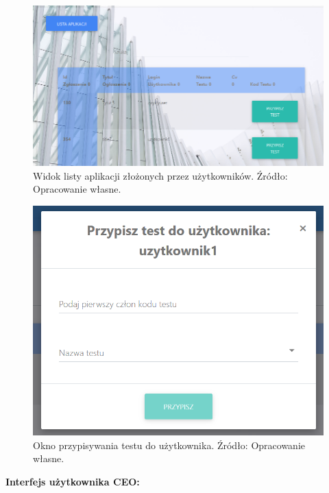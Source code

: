 \documentclass[twoside]{projektInzynierskiMS}
\numberwithin{figure}{section}
\begin{document}
\begin{figure}[h!]
    \centering
    \includegraphics[scale=0.6]{images/listaAplikacjiHr.png}
    \caption{Widok listy aplikacji złożonych przez użytkowników. Źródło: Opracowanie własne.}
    \label{fig:lista_aplikacji_hr}
\end{figure}

\begin{figure}[h!]
    \centering
    \includegraphics[scale=0.4]{images/modalPrzypisywaniaTestu.png}
    \caption{Okno przypisywania testu do użytkownika. Źródło: Opracowanie własne.}
    \label{fig:okno_przypisywania_testu_rekrutacyjnego}
\end{figure}

\newpage

\textbf{Interfejs użytkownika CEO:}
\end{document}
